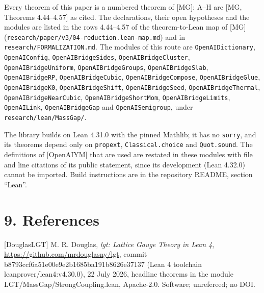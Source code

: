 \documentclass[10pt,letterpaper,twocolumn]{article}
\begin{document}
Every theorem of this paper is a numbered theorem of {[}MG{]}: A--H are {[}MG, Theorems 4.44--4.57{]} as cited. The declarations, their open hypotheses and the modules are listed in the rows 4.44--4.57 of the theorem-to-Lean map of {[}MG{]} (\texttt{research/\allowbreak{}paper/\allowbreak{}v3/\allowbreak{}04-{}\allowbreak{}reduction.\allowbreak{}lean-{}\allowbreak{}map.\allowbreak{}md}) and in \texttt{research/\allowbreak{}FORMALIZATION.\allowbreak{}md}. The modules of this route are \texttt{OpenAIDictionary}, \texttt{OpenAIConfig}, \texttt{OpenAIBridgeSides}, \texttt{OpenAIBridgeCluster}, \texttt{OpenAIBridgeUniform}, \texttt{OpenAIBridgeGroups}, \texttt{OpenAIBridgeSlab}, \texttt{OpenAIBridgeRP}, \texttt{OpenAIBridgeCubic}, \texttt{OpenAIBridgeCompose}, \texttt{OpenAIBridgeGlue}, \texttt{OpenAIBridgeK0}, \texttt{OpenAIBridgeShift}, \texttt{OpenAIBridgeSeed}, \texttt{OpenAIBridgeThermal}, \texttt{OpenAIBridgeNearCubic}, \texttt{OpenAIBridgeShortMom}, \texttt{OpenAIBridgeLimits}, \texttt{OpenAILink}, \texttt{OpenAIBridgeGap} and \texttt{OpenAISemigroup}, under \texttt{research/\allowbreak{}lean/\allowbreak{}MassGap/\allowbreak{}}.

The library builds on Lean 4.31.0 with the pinned Mathlib; it has no \texttt{sorry}, and its theorems depend only on \texttt{propext}, \texttt{Classical.\allowbreak{}choice} and \texttt{Quot.\allowbreak{}sound}. The definitions of {[}OpenAIYM{]} that are used are restated in these modules with file and line citations of its public statement, since its development (Lean 4.32.0) cannot be imported. Build instructions are in the repository README, section ``Lean''.

\section{9. References}\label{9-references}

{[}DouglasLGT{]} M. R. Douglas, \emph{lgt: Lattice Gauge Theory in Lean 4}, \href{https://github.com/mrdouglasny/lgt}{https:\allowbreak{}/\allowbreak{}/\allowbreak{}github.\allowbreak{}com/\allowbreak{}mrdougla\allowbreak{}sny/\allowbreak{}lgt}, commit b8793ccf\allowbreak{}6a51e00e\allowbreak{}9e2b1685\allowbreak{}ba191b86\allowbreak{}26e37137 (Lean 4 toolchain leanprov\allowbreak{}er/\allowbreak{}lean4:\allowbreak{}v4.\allowbreak{}30.\allowbreak{}0)\allowbreak{}, 22 July 2026, headline theorems in the module LGT/\allowbreak{}MassGap/\allowbreak{}StrongCo\allowbreak{}upling.\allowbreak{}lean, Apache-2.0. Software; unrefereed; no DOI.
\end{document}
